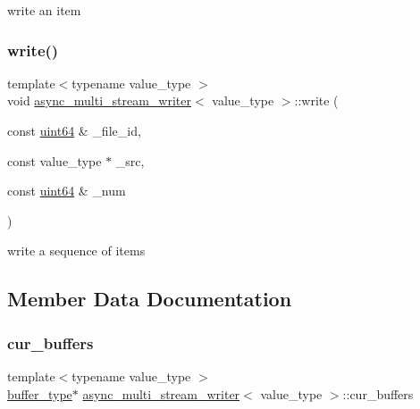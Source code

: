 write an item 

\mbox{\label{classasync__multi__stream__writer_af44e02f6c2eac01f1022b51105ea9cc0}} 
\subsubsection{\texorpdfstring{write()}{write()}\hspace{0.1cm}{\footnotesize\ttfamily [2/2]}}
{\footnotesize\ttfamily template$<$typename value\+\_\+type $>$ \\
void \hyperlink{classasync__multi__stream__writer}{async\+\_\+multi\+\_\+stream\+\_\+writer}$<$ value\+\_\+type $>$\+::write (\begin{DoxyParamCaption}\item[{const \hyperlink{types_8h_a60e8696a4678cd348e991a1f172e53f7}{uint64} \&}]{\+\_\+file\+\_\+id,  }\item[{const value\+\_\+type $\ast$}]{\+\_\+src,  }\item[{const \hyperlink{types_8h_a60e8696a4678cd348e991a1f172e53f7}{uint64} \&}]{\+\_\+num }\end{DoxyParamCaption})\hspace{0.3cm}{\ttfamily [inline]}}



write a sequence of items 



\subsection{Member Data Documentation}
\mbox{\label{classasync__multi__stream__writer_af1f19cbe619c771f1786abc038146e72}} 
\subsubsection{\texorpdfstring{cur\+\_\+buffers}{cur\_buffers}}
{\footnotesize\ttfamily template$<$typename value\+\_\+type $>$ \\
\hyperlink{classasync__multi__stream__writer_ae11c006e394241a9a5b003a30e8c8c92}{buffer\+\_\+type}$\ast$ \hyperlink{classasync__multi__stream__writer}{async\+\_\+multi\+\_\+stream\+\_\+writer}$<$ value\+\_\+type $>$\+::cur\+\_\+buffers\hspace{0.3cm}{\ttfamily [private]}}



